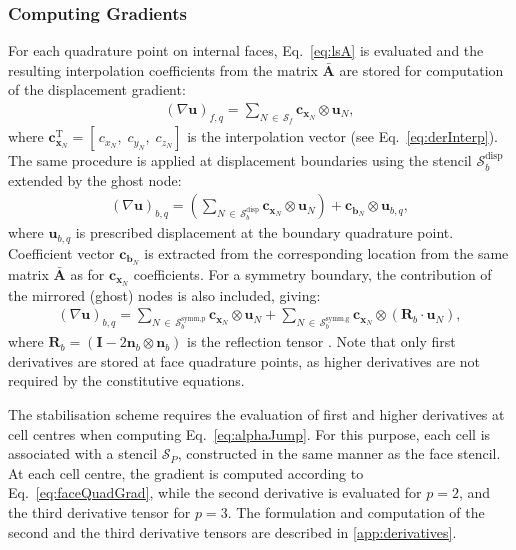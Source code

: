 \documentclass[review,3p]{elsarticle}
\newcommand{\bb}{\boldsymbol}
\begin{document}
\subsubsection{Computing Gradients}
\label{sec:grad}
%
For each quadrature point on internal faces, Eq.~\eqref{eq:lsA} is evaluated and the resulting interpolation coefficients from the matrix $\mathbf{\bar{A}}$ are stored for computation of the displacement gradient:
%
\begin{eqnarray}\label{eq:faceQuadGrad}
	(\nabla \bb{u})_{f,q} = \sum_{N \,\in\,  \mathcal{S}_f}  \bb{c}_{\bb{x}_N} \otimes \bb{u}_N,
\end{eqnarray}
%
where $\bb{c}_{\bb{x}_N}^{\mathrm{T}} = \left[ \,c_{x_N}, \; c_{y_N},\; c_{z_N} \right]$ is the interpolation vector (see Eq.~\eqref{eq:derInterp}).
The same procedure is applied at displacement boundaries using the stencil $\mathcal{S}_b^{\text{disp}}$  extended by the ghost node:
%
\begin{eqnarray}
	(\nabla \bb{u})_{b,q} = \left(\sum_{N \,\in\,  \mathcal{S}_b^{\text{disp}}}  \bb{c}_{\bb{x}_N} \otimes \bb{u}_N \right)+ \bb{c}_{\bb{b}_N} \otimes \bb{u}_{b,q},
\end{eqnarray}
%
where $\bb{u}_{b,q}$ is prescribed displacement at the boundary quadrature point. Coefficient vector $\bb{c}_{\bb{b}_N}$ is extracted from the corresponding location from the same matrix $\mathbf{\bar{A}}$ as for $\bb{c}_{\bb{x}_N}$ coefficients.
For a symmetry boundary, the contribution of the mirrored (ghost) nodes is also included, giving:
%
\begin{eqnarray}
	(\nabla \bb{u})_{b,q} =
	\sum_{N \,\in\,  \mathcal{S}_b^{\text{symm,p}}}  \bb{c}_{\bb{x}_N} \otimes \bb{u}_N +
	\sum_{N \,\in\,  \mathcal{S}_b^{\text{symm,g}}}  \bb{c}_{\bb{x}_N} \otimes ( \bb{R}_b \cdot \bb{u}_N),
\end{eqnarray}
%
where $ \bb{R}_b = (\bb{I}-2\bb{n}_b \otimes \bb{n}_b)$ is the reflection tensor \cite{Demirdzic2022}.
Note that only first derivatives are stored at face quadrature points, as higher derivatives are not required by the constitutive equations.

The stabilisation scheme requires the evaluation of first and higher derivatives at cell centres when computing Eq.~\eqref{eq:alphaJump}.
For this purpose, each cell is associated with a stencil $\mathcal{S}_P$, constructed in the same manner as the face stencil.
At each cell centre, the gradient is computed according to Eq.~\eqref{eq:faceQuadGrad}, while the second derivative is evaluated for $p = 2$, and the third derivative tensor for $p = 3$.
The formulation and computation of the second and the third derivative tensors are described in \ref{app:derivatives}.
%
%
\end{document}
